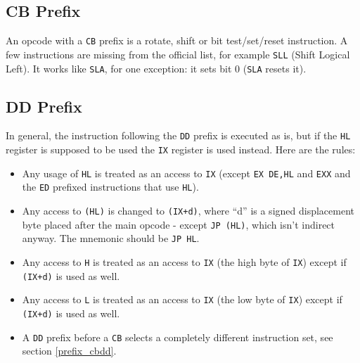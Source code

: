 \subsection{CB Prefix \cite{gerton}}
\label{prefix_cb}

An opcode with a {\tt CB} prefix is a rotate, shift or bit test/set/reset instruction. A few instructions are missing from the official list, for example {\tt SLL} (Shift Logical Left). It works like {\tt SLA}, for one exception: it sets bit 0 ({\tt SLA} resets it).


\subsection{DD Prefix \cite{gerton}}

In general, the instruction following the {\tt DD} prefix is executed as is, but if the {\tt HL} register is supposed to be used the {\tt IX} register is used instead. Here are the rules:

\begin{itemize}[topsep=1pt,itemsep=1pt]
	\item Any usage of {\tt HL} is treated as an access to {\tt IX} (except {\tt EX DE,HL} and {\tt EXX} and the {\tt ED} prefixed instructions that use {\tt HL}).
	
	\item Any access to {\tt (HL)} is changed to {\tt (IX+d)}, where ``d'' is a signed displacement byte placed after the main opcode - except {\tt JP (HL)}, which isn't indirect anyway. The mnemonic should be {\tt JP HL}.
	
	\item Any access to {\tt H} is treated as an access to {\tt IX\High} (the high byte of {\tt IX}) except if {\tt (IX+d)} is used as well.
	
	\item Any access to {\tt L} is treated as an access to {\tt IX\Low} (the low byte of {\tt IX}) except if {\tt (IX+d)} is used as well.
	
	\item A {\tt DD} prefix before a {\tt CB} selects a completely different instruction set, see section {\ref{prefix_cbdd}}.
\end{itemize}

